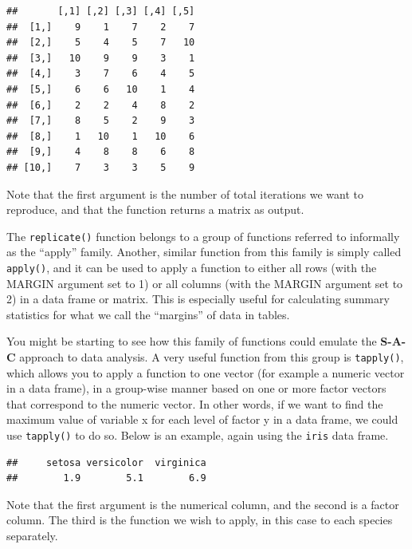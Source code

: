 \documentclass[]{book}
\newenvironment{Shaded}{\begin{snugshade}}{\end{snugshade}}
\newcommand{\CommentTok}[1]{\textcolor[rgb]{0.56,0.35,0.01}{\textit{#1}}}
\newcommand{\KeywordTok}[1]{\textcolor[rgb]{0.13,0.29,0.53}{\textbf{#1}}}
\newcommand{\NormalTok}[1]{#1}
\newcommand{\OperatorTok}[1]{\textcolor[rgb]{0.81,0.36,0.00}{\textbf{#1}}}
\begin{document}
\begin{verbatim}
##       [,1] [,2] [,3] [,4] [,5]
##  [1,]    9    1    7    2    7
##  [2,]    5    4    5    7   10
##  [3,]   10    9    9    3    1
##  [4,]    3    7    6    4    5
##  [5,]    6    6   10    1    4
##  [6,]    2    2    4    8    2
##  [7,]    8    5    2    9    3
##  [8,]    1   10    1   10    6
##  [9,]    4    8    8    6    8
## [10,]    7    3    3    5    9
\end{verbatim}

Note that the first argument is the number of total iterations we want to reproduce, and that the function returns a matrix as output.

The \texttt{replicate()} function belongs to a group of functions referred to informally as the ``apply'' family. Another, similar function from this family is simply called \texttt{apply()}, and it can be used to apply a function to either all rows (with the MARGIN argument set to 1) or all columns (with the MARGIN argument set to 2) in a data frame or matrix. This is especially useful for calculating summary statistics for what we call the ``margins'' of data in tables.

You might be starting to see how this family of functions could emulate the \textbf{S-A-C} approach to data analysis. A very useful function from this group is \texttt{tapply()}, which allows you to apply a function to one vector (for example a numeric vector in a data frame), in a group-wise manner based on one or more factor vectors that correspond to the numeric vector. In other words, if we want to find the maximum value of variable x for each level of factor y in a data frame, we could use \texttt{tapply()} to do so. Below is an example, again using the \texttt{iris} data frame.

\begin{Shaded}
\end{Shaded}

\begin{verbatim}
##     setosa versicolor  virginica 
##        1.9        5.1        6.9
\end{verbatim}

Note that the first argument is the numerical column, and the second is a factor column. The third is the function we wish to apply, in this case to each species separately.
\end{document}
